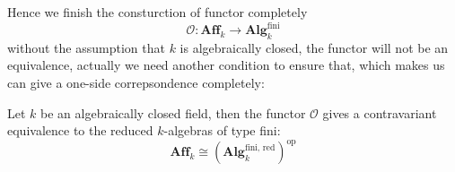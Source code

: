 Hence we finish the consturction of functor completely
\[\mathcal{O}: \mathbf{Aff}_k \to \mathbf{Alg}_k^{\text{fini}}\]
without the assumption that \(k\) is algebraically closed, the functor will not be an equivalence, actually we need another condition to ensure that, which makes us can give a one-side correpsondence completely:
\begin{theorem}
    Let \(k\) be an algebraically closed field, then the functor \(\mathcal{O}\) gives a contravariant equivalence to the reduced \(k\)-algebras of type fini:
    \[\mathbf{Aff}_k \cong (\mathbf{Alg}_k^{\text{fini, red}})^{\text{op}}\]
\end{theorem}



